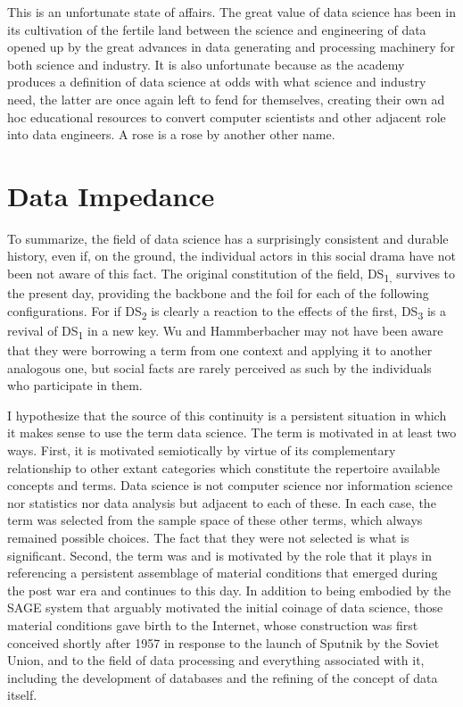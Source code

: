 \documentclass[
  letterpaper,
]{report}
\begin{document}
This is an unfortunate state of affairs. The great value of data science
has been in its cultivation of the fertile land between the science and
engineering of data opened up by the great advances in data generating
and processing machinery for both science and industry. It is also
unfortunate because as the academy produces a definition of data science
at odds with what science and industry need, the latter are once again
left to fend for themselves, creating their own ad hoc educational
resources to convert computer scientists and other adjacent role into
data engineers. A rose is a rose by another other name.

\hypertarget{data-impedance}{%
\section{Data Impedance}\label{data-impedance}}

To summarize, the field of data science has a surprisingly consistent
and durable history, even if, on the ground, the individual actors in
this social drama have not been not aware of this fact. The original
constitution of the field, DS\textsubscript{1,} survives to the present
day, providing the backbone and the foil for each of the following
configurations. For if DS\textsubscript{2} is clearly a reaction to the
effects of the first, DS\textsubscript{3} is a revival of
DS\textsubscript{1} in a new key. Wu and Hammberbacher may not have been
aware that they were borrowing a term from one context and applying it
to another analogous one, but social facts are rarely perceived as such
by the individuals who participate in them.

I hypothesize that the source of this continuity is a persistent
situation in which it makes sense to use the term data science. The term
is motivated in at least two ways. First, it is motivated semiotically
by virtue of its complementary relationship to other extant categories
which constitute the repertoire available concepts and terms. Data
science is not computer science nor information science nor statistics
nor data analysis but adjacent to each of these. In each case, the term
was selected from the sample space of these other terms, which always
remained possible choices. The fact that they were not selected is what
is significant. Second, the term was and is motivated by the role that
it plays in referencing a persistent assemblage of material conditions
that emerged during the post war era and continues to this day. In
addition to being embodied by the SAGE system that arguably motivated
the initial coinage of data science, those material conditions gave
birth to the Internet, whose construction was first conceived shortly
after 1957 in response to the launch of Sputnik by the Soviet Union, and
to the field of data processing and everything associated with it,
including the development of databases and the refining of the concept
of data itself.
\end{document}
